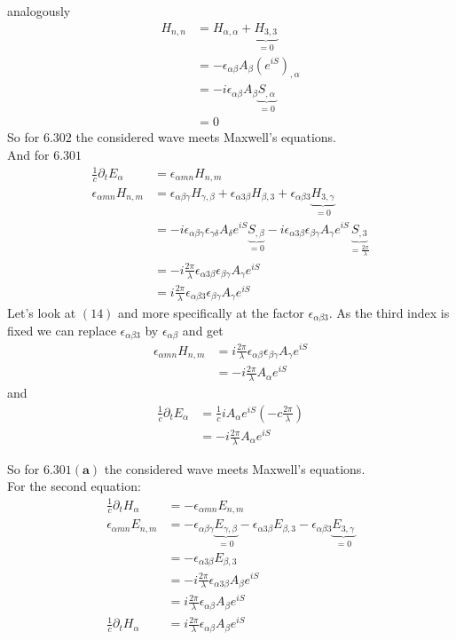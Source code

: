 analogously
\begin{align}
H_{n,n}&=H_{\alpha,\alpha}+ \underbrace{H_{3,3}}_{=0}\\
&=-\epsilon_{\alpha\beta}A_{\beta}\left(e^{iS}\right)_{,\alpha}\\
&=-i\epsilon_{\alpha\beta}A_{\beta}\underbrace{S_{,\alpha}}_{=0}\\
&=0
\end{align}
So for $\mathbf{6.302}$ the considered wave meets Maxwell's equations.\\
And for $\mathbf{6.301}$ 
\begin{align}
\frac{1}{c}\partial_t E_{\alpha}&=\epsilon_{\alpha mn}H_{n,m}\\
\epsilon_{\alpha mn}H_{n,m}&= \epsilon_{\alpha\beta\gamma}H_{\gamma,\beta}+\epsilon_{\alpha 3\beta}H_{\beta,3}+\epsilon_{\alpha\beta 3}\underbrace{H_{3,\gamma}}_{=0}\\
&= -i\epsilon_{\alpha\beta\gamma}\epsilon_{\gamma\delta}A_{\delta}e^{iS}\underbrace{S_{,\beta}}_{=0}-i\epsilon_{\alpha 3 \beta}\epsilon_{\beta \gamma}A_{\gamma}e^{iS}\underbrace{S_{,3}}_{=\frac{2\pi}{\lambda}}\\
&= -i\frac{2\pi}{\lambda}\epsilon_{\alpha 3 \beta}\epsilon_{\beta \gamma}A_{\gamma}e^{iS}\\
&= i\frac{2\pi}{\lambda}\epsilon_{\alpha  \beta 3 }\epsilon_{\beta \gamma}A_{\gamma}e^{iS}
\end{align}
Let's look at $(14)$ and more specifically at the factor $\epsilon_{\alpha  \beta 3}$. As the third index is fixed we can replace $\epsilon_{\alpha  \beta  3}$ by $\epsilon_{\alpha  \beta}$ and get 
\begin{align}
\epsilon_{\alpha mn}H_{n,m}&= i\frac{2\pi}{\lambda}\epsilon_{\alpha  \beta  }\epsilon_{\beta \gamma}A_{\gamma}e^{iS}\\
&= -i\frac{2\pi}{\lambda}A_{\alpha}e^{iS}
\end{align}
and 
\begin{align}
\frac{1}{c}\partial_t E_{\alpha}&=\frac{1}{c}iA_{\alpha}e^{iS}\left(-c\frac{2\pi}{\lambda}\right)\\
&=-i\frac{2\pi}{\lambda}A_{\alpha}e^{iS}
\end{align}

So for $\mathbf{6.301 (a)}$ the considered wave meets Maxwell's equations.\\
For the second equation: 
\begin{align}
\frac{1}{c}\partial_t H_{\alpha}&=-\epsilon_{\alpha mn}E_{n,m}\\
\epsilon_{\alpha mn}E_{n,m}&= -\epsilon_{\alpha\beta\gamma}\underbrace{E_{\gamma,\beta}}_{=0}-\epsilon_{\alpha 3\beta}E_{\beta,3}-\epsilon_{\alpha\beta 3}\underbrace{E_{3,\gamma}}_{=0}\\
&=-\epsilon_{\alpha 3\beta}E_{\beta,3}\\
&= -i\frac{2\pi}{\lambda}\epsilon_{\alpha 3\beta}A_{\beta}e^{iS}\\
&= i\frac{2\pi}{\lambda}\epsilon_{\alpha \beta }A_{\beta}e^{iS}\\
\frac{1}{c}\partial_t H_{\alpha}&= i\frac{2\pi}{\lambda}\epsilon_{\alpha \beta}A_{\beta}e^{iS}
\end{align}

